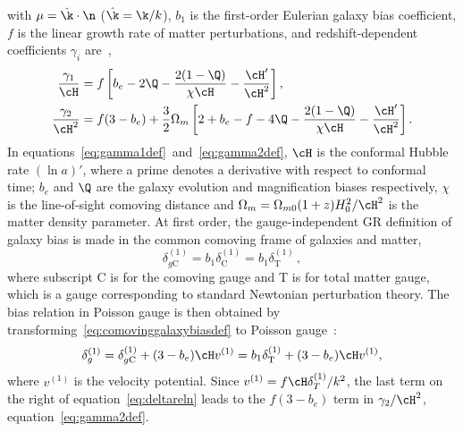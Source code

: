 with \(\mu = \hat\k \cdot \n \) (\(\hat\k = \k/k\)), \(b_1\) is the first-order Eulerian galaxy bias coefficient, \(f\) is the linear growth rate of matter perturbations, and redshift-dependent coefficients \(\gamma_i\) are~\cite{Jeong_2012},
\begin{align}\label{eq:gamma1def}
\frac{\gamma_1}{\cH} &= f \left[ b_e - 2 \Q - \frac{2(1-\Q)}{\chi \cH} - \frac{\cH'}{\cH^2}\right], \\
\frac{\gamma_2}{\cH^2} &= f(3-b_e) + \frac{3}{2} \Omega_m \left[ 2+ b_e - f - 4\Q - \frac{2(1-\Q)}{\chi\cH} - \frac{\cH'}{\cH^2} \right].\label{eq:gamma2def}
\end{align}
In equations~\eqref{eq:gamma1def}~and~\eqref{eq:gamma2def}, \(\cH\) is the conformal Hubble rate \((\ln a)'\), where a prime denotes a derivative with respect to conformal time; \(b_e\) and \(\Q\) are the galaxy evolution and magnification biases respectively, \(\chi\) is the line-of-sight comoving distance and \(\Omega_m = \Omega_{m0} (1+z) H_0^2/\cH^2\) is the matter density parameter. At first order, the gauge-independent GR definition of galaxy bias is made in the common comoving frame of galaxies and matter, 
\begin{equation}\label{eq:comovinggalaxybiasdef}
	\delta_{g\mathrm{C}}^{(1)} = b_1 \delta_\mathrm{C}^{(1)} =  b_1 \delta_\mathrm{T}^{(1)}\,,
\end{equation}
where subscript C is for the comoving gauge and T is for total matter gauge, which is a gauge corresponding to standard Newtonian perturbation theory. The bias relation in Poisson gauge is then obtained by transforming~\eqref{eq:comovinggalaxybiasdef} to Poisson gauge~\cite{Bertacca:2014wga,Jolicoeur:2017eyi}:
\begin{equation}\label{eq:deltareln}
	\delta_g^{(1)} = \delta_{g\mathrm{C}}^{(1)} + (3 - b_e)\cH v^{(1)} = b_1 \delta_\mathrm{T}^{(1)} + (3-b_e)\cH v^{(1)},
\end{equation}
where \(v^{(1)}\) is the velocity potential. Since \(v^{(1)} =f \cH \delta_T^{(1)}/k^2\), the last term on the right of equation~\eqref{eq:deltareln} leads to the \(f(3-b_e)\) term in \(\gamma_2/\cH^2\), equation~\eqref{eq:gamma2def}.


